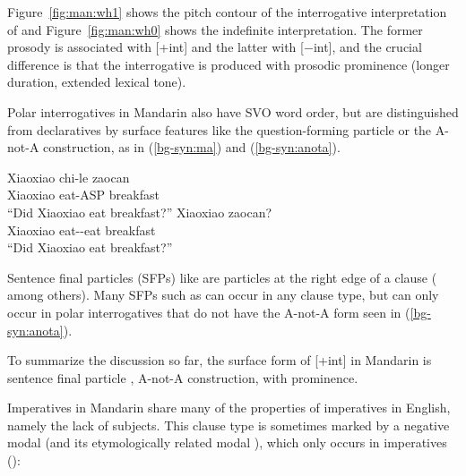  Figure~\ref{fig:man:wh1} shows the pitch contour of the interrogative interpretation of \twh{} and Figure~\ref{fig:man:wh0} shows the indefinite interpretation. The former prosody is associated with [+int] and the latter with [$-$int], and the crucial difference is that the interrogative  is produced with prosodic prominence (longer duration, extended lexical tone). 

Polar interrogatives in Mandarin also have SVO word order, but are distinguished from declaratives by surface features like the question-forming particle  or the A-not-A construction, as in (\ref{bg-syn:ma}) and (\ref{bg-syn:anota}).

\gll Xiaoxiao	chi-le	zaocan		\\
Xiaoxiao	eat-ASP	breakfast	\Sfp{}\\
``Did Xiaoxiao eat breakfast?''
\eex
{}
\gll Xiaoxiao		zaocan?\\
	Xiaoxiao	eat-\Neg-eat	breakfast\\
	``Did Xiaoxiao eat breakfast?''
\eex


Sentence final particles (SFPs) like \ma{} are  particles at the right edge of a clause (\citealt{chao1968, zhudexi, huang1982, cheng1991, liboya2006} among others). Many SFPs such as  can occur in any clause type, but \ma{} can only occur in polar interrogatives that do not have the A-not-A form seen in (\ref{bg-syn:anota}). 

To summarize the discussion so far, the surface form of [+int] in Mandarin is sentence final particle \ma{}, A-not-A construction, \twh{} with prominence. 

Imperatives in Mandarin share many of the properties of imperatives in English, namely the lack of subjects. This clause type is sometimes marked by a negative modal  (and its etymologically related modal ), which only occurs in imperatives (\cite{chao1968, lithompson}):

